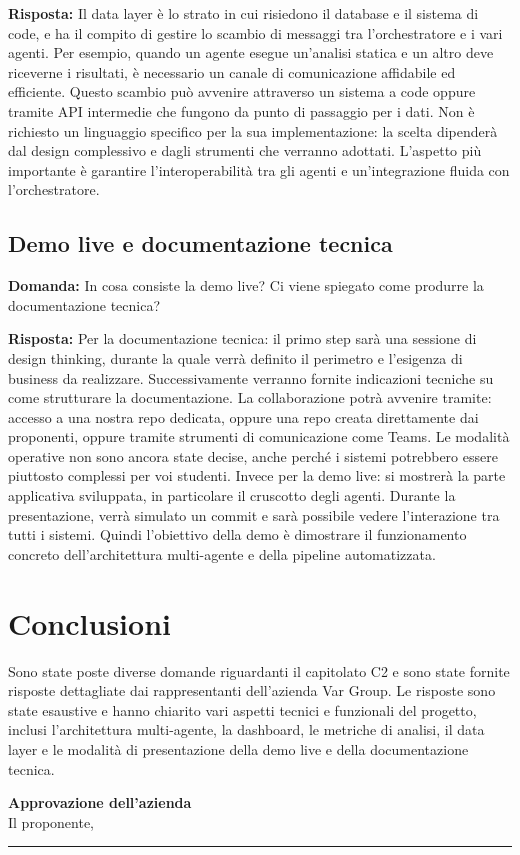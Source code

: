 \documentclass[a4paper,12pt]{article}
\begin{document}
{    \textbf{Risposta:} Il data layer è lo strato in cui risiedono il database e il sistema di code, e ha il compito di gestire lo scambio di messaggi tra l'orchestratore e i vari agenti. Per esempio, quando un agente esegue un'analisi statica e un altro deve riceverne i risultati, è necessario un canale di comunicazione affidabile ed efficiente. Questo scambio può avvenire attraverso un sistema a code oppure tramite API intermedie che fungono da punto di passaggio per i dati. Non è richiesto un linguaggio specifico per la sua implementazione: la scelta dipenderà dal design complessivo e dagli strumenti che verranno adottati. L'aspetto più importante è garantire l'interoperabilità tra gli agenti e un'integrazione fluida con l'orchestratore.

    \subsection{Demo live e documentazione tecnica}
    \textbf{Domanda:} In cosa consiste la demo live? Ci viene spiegato come produrre la documentazione tecnica?

    \textbf{Risposta:} Per la documentazione tecnica: il primo step sarà una sessione di design thinking, durante la quale verrà definito il perimetro e l'esigenza di business da realizzare. Successivamente verranno fornite indicazioni tecniche su come strutturare la documentazione. La collaborazione potrà avvenire tramite: accesso a una nostra repo dedicata, oppure una repo creata direttamente dai proponenti, oppure tramite strumenti di comunicazione come Teams. Le modalità operative non sono ancora state decise, anche perché i sistemi potrebbero essere piuttosto complessi per voi studenti. Invece per la demo live: si mostrerà la parte applicativa sviluppata, in particolare il cruscotto degli agenti. Durante la presentazione, verrà simulato un commit e sarà possibile vedere l'interazione tra tutti i sistemi. Quindi l'obiettivo della demo è dimostrare il funzionamento concreto dell'architettura multi-agente e della pipeline automatizzata.
}

\section{Conclusioni}{
    Sono state poste diverse domande riguardanti il capitolato C2 e sono state fornite risposte dettagliate dai rappresentanti dell'azienda Var Group. Le risposte sono state esaustive e hanno chiarito vari aspetti tecnici e funzionali del progetto, inclusi l'architettura multi-agente, la dashboard, le metriche di analisi, il data layer e le modalità di presentazione della demo live e della documentazione tecnica.
}

\vspace{2cm}
\begin{flushright}
    \textbf{Approvazione dell'azienda} \\
    Il proponente,\\[0.5cm]
    \rule{6cm}{0.4pt}\\
\end{flushright}
\end{document}
